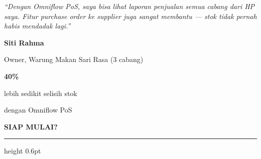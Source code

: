 \documentclass[a4paper]{article}
\newcommand{\sectiontitle}[1]{%
    \vspace{10pt}%
    {\fontsize{13}{16}\selectfont\bfseries\color{BlueDark} #1}\par\vspace{3pt}%
    {\color{BluePrimary}\hrule height 0.6pt}\par\vspace{8pt}%
}
\begin{document}
\noindent
\begin{minipage}[t]{0.485\textwidth}
    \colorbox{BlueBg}{%
        \begin{minipage}{\dimexpr\linewidth-2\fboxsep\relax}
            {\fontsize{9.5}{13}\selectfont\color{TextDark}\textit{``Dengan Omniflow PoS, saya bisa lihat laporan penjualan semua cabang dari HP saya. Fitur purchase order ke supplier juga sangat membantu — stok tidak pernah habis mendadak lagi.''}}\par\vspace{4pt}
            {\fontsize{8.5}{11}\selectfont\bfseries\color{BluePrimary} Siti Rahma}\par
            {\fontsize{8}{10}\selectfont\color{TextLight} Owner, Warung Makan Sari Rasa (3 cabang)}
        \end{minipage}}
\end{minipage}%
\hfill
\begin{minipage}[t]{0.485\textwidth}
    \colorbox{BlueBg}{%
        \begin{minipage}{\dimexpr\linewidth-2\fboxsep\relax}
            \begin{center}
                {\fontsize{20}{24}\selectfont\bfseries\color{AmberPrimary} 40\%}\par
                {\fontsize{9.5}{12}\selectfont\color{TextDark} lebih sedikit selisih stok}\par
                {\fontsize{9.5}{12}\selectfont\color{TextDark} dengan Omniflow PoS}
            \end{center}
        \end{minipage}}
\end{minipage}

\sectiontitle{SIAP MULAI?}
\end{document}

